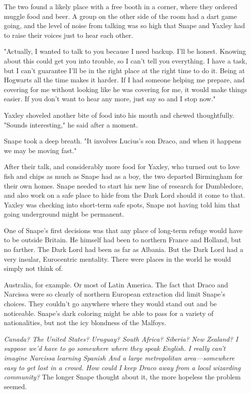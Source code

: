 The two found a likely place with a free booth in a corner, where they ordered muggle food and beer. A group on the other side of the room had a dart game going, and the level of noise from talking was so high that Snape and Yaxley had to raise their voices just to hear each other.

"Actually, I wanted to talk to you because I need backup. I'll be honest. Knowing about this could get you into trouble, so I can't tell you everything. I have a task, but I can't guarantee I'll be in the right place at the right time to do it. Being at Hogwarts all the time makes it harder. If I had someone helping me prepare, and covering for me without looking like he was covering for me, it would make things easier. If you don't want to hear any more, just say so and I stop now."

Yaxley shoveled another bite of food into his mouth and chewed thoughtfully. "Sounds interesting," he said after a moment.

Snape took a deep breath. "It involves Lucius's son Draco, and when it happens we may be moving fast."

After their talk, and considerably more food for Yaxley, who turned out to love fish and chips as much as Snape had as a boy, the two departed Birmingham for their own homes. Snape needed to start his new line of research for Dumbledore, and also work on a safe place to hide from the Dark Lord should it come to that. Yaxley was checking into short-term safe spots, Snape not having told him that going underground might be permanent.

One of Snape's first decisions was that any place of long-term refuge would have to be outside Britain. He himself had been to northern France and Holland, but no farther. The Dark Lord had been as far as Albania. But the Dark Lord had a very insular, Eurocentric mentality. There were places in the world he would simply not think of.

Australia, for example. Or most of Latin America. The fact that Draco and Narcissa were so clearly of northern European extraction did limit Snape's choices. They couldn't go anywhere where they would stand out and be noticeable. Snape's dark coloring might be able to pass for a variety of nationalities, but not the icy blondness of the Malfoys.

\emph{Canada? The United States? Uruguay? South Africa? Siberia? New Zealand? I suppose we'd have to go somewhere where they speak English. I really can't imagine Narcissa learning Spanish{\el} And a large metropolitan area—somewhere easy to get lost in a crowd. How could I keep Draco away from a local wizarding community?} The longer Snape thought about it, the more hopeless the problem seemed.

